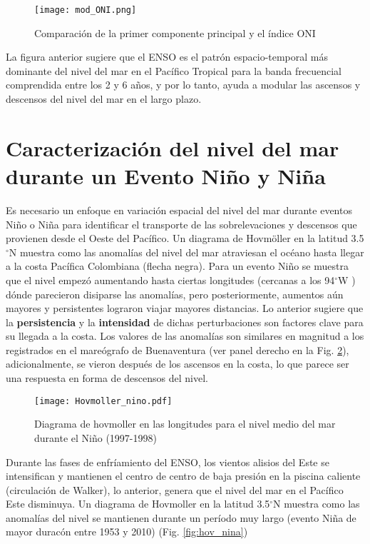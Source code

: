 \begin{figure}[H]
	\centering
	\texttt{[image: mod\_ONI.png]}
	\caption{Comparación de la primer componente principal y el índice ONI}
	\label{fig:PC_ONI}
\end{figure}

La figura anterior sugiere que el ENSO es el patrón espacio-temporal más dominante del nivel del mar en el Pacífico Tropical para la banda frecuencial comprendida entre los 2 y 6 años, y por lo tanto, ayuda a modular las ascensos y descensos del nivel del mar en el largo plazo.

\section{Caracterización del nivel del mar durante un Evento Niño y Niña}

Es necesario un enfoque en variación espacial del nivel del mar durante eventos Niño o Niña para identificar el transporte de las sobrelevaciones y descensos que provienen desde el Oeste del Pacífico. Un diagrama de Hovmöller en la latitud 3.5$^{\circ}$N muestra como las anomalías del nivel del mar atraviesan el océano hasta llegar a la costa Pacífica Colombiana (flecha negra). Para un evento Niño se muestra que el nivel empezó aumentando hasta ciertas longitudes (cercanas a los 94$^{\circ}$W ) dónde parecieron disiparse las anomalías, pero posteriormente, aumentos aún mayores y persistentes lograron viajar mayores distancias. Lo anterior sugiere que la \textbf{persistencia} y la \textbf{intensidad} de dichas perturbaciones son factores clave para su llegada a la costa. Los valores de las anomalías son similares en magnitud a los registrados en el mareógrafo de Buenaventura (ver panel derecho en la Fig. \ref{fig:hov_nino}), adicionalmente, se vieron después de los ascensos en la costa, lo que parece ser una respuesta en forma de descensos del nivel. 

\begin{figure}[h]
	\centering
	\texttt{[image: Hovmoller\_nino.pdf]}
	\caption{Diagrama de hovmoller en las longitudes para el nivel medio del mar durante el Niño (1997-1998)}
	\label{fig:hov_nino}
\end{figure}

Durante las fases de enfríamiento del ENSO, los vientos alisios del Este se intensifican y mantienen el centro de centro de baja presión en la piscina caliente (circulación de Walker), lo anterior, genera que el nivel del mar en el Pacífico Este disminuya. Un diagrama de Hovmoller en la latitud 3.5$^{\circ}$N muestra como las anomalías del nivel se mantienen durante un período muy largo (evento Niña de mayor duracón entre 1953 y 2010) (Fig. \ref{fig:hov_nina})


